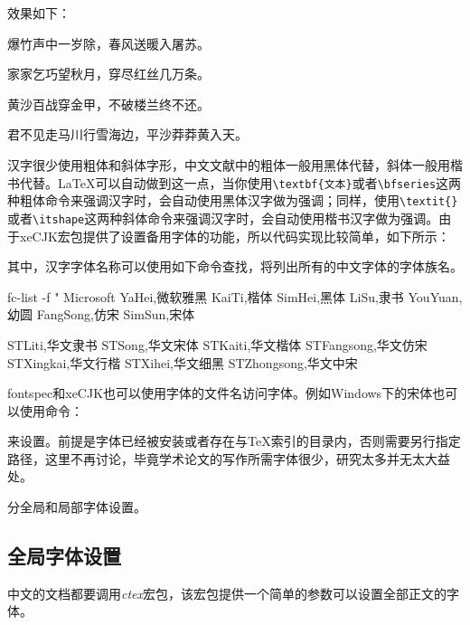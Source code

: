 效果如下：

\begin{center}
    {\songti 爆竹声中一岁除，春风送暖入屠苏。}\par
    {\fangsong 家家乞巧望秋月，穿尽红丝几万条。}\par
    {\heiti 黄沙百战穿金甲，不破楼兰终不还。}\par
    {\kaishu 君不见走马川行雪海边，平沙莽莽黄入天。}
\end{center}

汉字很少使用粗体和斜体字形，中文文献中的粗体一般用黑体代替，斜体一般用楷书代替。\LaTeX 可以自动做到这一点，当你使用\lstinline|\textbf{文本}|或者\lstinline|\bfseries|这两种粗体命令来强调汉字时，会自动使用黑体汉字做为强调；同样，使用\lstinline|\textit{}|或者\lstinline|\itshape|这两种斜体命令来强调汉字时，会自动使用楷书汉字做为强调。由于xeCJK宏包提供了设置备用字体的功能，所以代码实现比较简单，如下所示：

\begin{latex}
\end{latex}

其中，汉字字体名称可以使用如下命令查找，将列出所有的中文字体的字体族名。

\begin{latex}
fc-list -f "%
Microsoft YaHei,微软雅黑
KaiTi,楷体
SimHei,黑体
LiSu,隶书
YouYuan,幼圆
FangSong,仿宋
SimSun,宋体

STLiti,华文隶书
STSong,华文宋体
STKaiti,华文楷体
STFangsong,华文仿宋
STXingkai,华文行楷
STXihei,华文细黑
STZhongsong,华文中宋
\end{latex}

fontspec和xeCJK也可以使用字体的文件名访问字体。例如Windows下的宋体也可以使用命令：
\begin{latex}
\end{latex}
来设置。前提是字体已经被安装或者存在与\TeX 索引的目录内，否则需要另行指定路径，这里不再讨论，毕竟学术论文的写作所需字体很少，研究太多并无太大益处。

分全局和局部字体设置。
\subsection{全局字体设置}
中文的文档都要调用\emph{ctex}宏包，该宏包提供一个简单的参数可以设置全部正文的字体。

\begin{latex}
\setmainfont{Times New Roman}    %
\end{latex}

